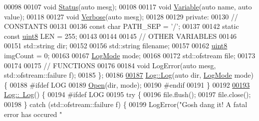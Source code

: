 \begin{DoxyCode}
00098 
00107             \textcolor{keywordtype}{void} \hyperlink{classChipChipArray_1_1Log_a66575b6e94c6112e4cefa5736cb996e0}{Status}(\textcolor{keyword}{auto} mesg);
00108 
00117             \textcolor{keywordtype}{void} \hyperlink{classChipChipArray_1_1Log_a8849569720c26e335e7ef4dcb912170b}{Variable}(\textcolor{keyword}{auto} name, \textcolor{keyword}{auto} value);
00118 
00127             \textcolor{keywordtype}{void} \hyperlink{classChipChipArray_1_1Log_a154a5f38d9c7a767693b242684a3d4d9}{Verbose}(\textcolor{keyword}{auto} mesg);
00128 
00129         \textcolor{keyword}{private}:
00130             \textcolor{comment}{// CONSTANTS}
00131 
00136             \textcolor{keyword}{const} \textcolor{keywordtype}{char} PATH\_SEP = \textcolor{charliteral}{'/'};
00137 
00142             \textcolor{keyword}{static} \textcolor{keyword}{const} \hyperlink{definitions_8hpp_adde6aaee8457bee49c2a92621fe22b79}{uint8} LEN = 255;
00143 
00144 
00145             \textcolor{comment}{// OTHER VARIABLES}
00146 
00151             std::string dir;
00152 
00156             std::string filename;
00157 
00162             \hyperlink{definitions_8hpp_adde6aaee8457bee49c2a92621fe22b79}{uint8} imgCount = 0;
00163 
00167             \hyperlink{definitions_8hpp_aa7380b6d694cab49f07aed6a7af592d9}{LogMode} mode;
00168 
00172             std::ofstream file;
00173 
00174 
00175             \textcolor{comment}{// FUNCTIONS}
00176 
00184             \textcolor{keywordtype}{void} LogError(\textcolor{keyword}{auto} mesg, std::ofstream::failure f);
00185     \};
00186 
\hypertarget{Log_8hpp_source_l00187}{}\hyperlink{classChipChipArray_1_1Log_a4cd28a821789b39e936a6e346329d65b}{00187}     \hyperlink{classChipChipArray_1_1Log_a2bd48afdb832567e94545e6dc2f6f4d5}{Log::Log}(\textcolor{keyword}{auto} dir, \hyperlink{definitions_8hpp_aa7380b6d694cab49f07aed6a7af592d9}{LogMode} mode) \{
00188 \textcolor{preprocessor}{#ifdef LOG}
00189         \hyperlink{classChipChipArray_1_1Log_ad27a06a4561f2f59159bd8a7fc2fed3b}{Open}(dir, mode);
00190 \textcolor{preprocessor}{#endif}
00191     \}
00192 
\hypertarget{Log_8hpp_source_l00193}{}\hyperlink{classChipChipArray_1_1Log_a647df4da22b29d9d5a5ea32af3a1ed83}{00193}     \hyperlink{classChipChipArray_1_1Log_a647df4da22b29d9d5a5ea32af3a1ed83}{Log::~Log}() \{
00194 \textcolor{preprocessor}{#ifdef LOG}
00195         \textcolor{keywordflow}{try} \{
00196             file.flush();
00197             file.close();
00198         \} \textcolor{keywordflow}{catch} (std::ofstream::failure f) \{
00199             LogError(\textcolor{stringliteral}{"Gosh dang it! A fatal error has occured "} 

\end{DoxyCode}
